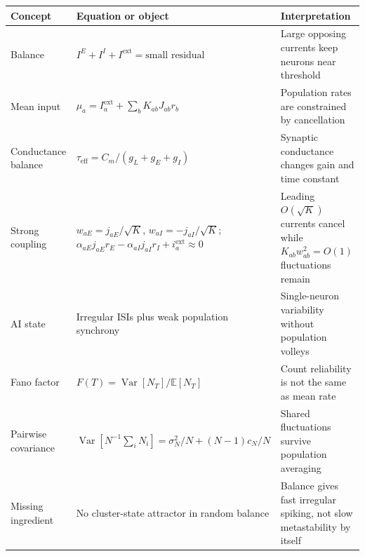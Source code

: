 \begin{chaptersummary}

\begin{center}
\renewcommand{\arraystretch}{1.55}
\begin{tabularx}{\textwidth}{@{}l X X@{}}
  \toprule
  \textbf{Concept} & \textbf{Equation or object} & \textbf{Interpretation} \\
  \midrule
  Balance &
  $I^E+I^I+I^{\mathrm{ext}}=\text{small residual}$ &
  Large opposing currents keep neurons near threshold \\
  Mean input &
  $\mu_a=I_a^{\mathrm{ext}}+\sum_b K_{ab}J_{ab}r_b$ &
  Population rates are constrained by cancellation \\
  Conductance balance &
  $\tau_{\mathrm{eff}}=C_m/(g_L+g_E+g_I)$ &
  Synaptic conductance changes gain and time constant \\
  Strong coupling &
  $w_{aE}=j_{aE}/\sqrt K$, $w_{aI}=-j_{aI}/\sqrt K$; $\alpha_{aE}j_{aE}r_E-\alpha_{aI}j_{aI}r_I+i_a^{\mathrm{ext}}\approx0$ &
  Leading $O(\sqrt K)$ currents cancel while $K_{ab}w_{ab}^2=O(1)$ fluctuations remain \\
  AI state &
  Irregular ISIs plus weak population synchrony &
  Single-neuron variability without population volleys \\
  Fano factor &
  $F(T)=\operatorname{Var}[N_T]/\mathbb{E}[N_T]$ &
  Count reliability is not the same as mean rate \\
  Pairwise covariance &
  $\operatorname{Var}[N^{-1}\sum_i N_i]=\sigma_N^2/N+(N-1)c_N/N$ &
  Shared fluctuations survive population averaging \\
  Missing ingredient &
  No cluster-state attractor in random balance &
  Balance gives fast irregular spiking, not slow metastability by itself \\
  \bottomrule
\end{tabularx}
\end{center}

\end{chaptersummary}


